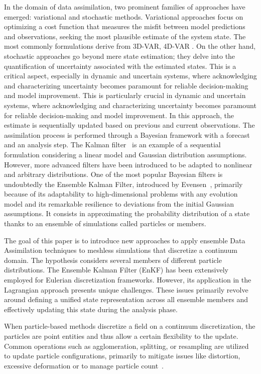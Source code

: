 In the domain of data assimilation, two prominent families of approaches have emerged: variational and stochastic methods. Variational approaches \cite{variational_method} focus on optimizing a cost function that measures the misfit between model predictions and observations, seeking the most plausible estimate of the system state. The most commonly formulations derive from 3D-VAR, 4D-VAR \cite{talagrand1997assimilation}. On the other hand, stochastic approaches go beyond mere state estimation; they delve into the quantification of uncertainty associated with the estimated states. This is a critical aspect, especially in dynamic and uncertain systems, where acknowledging and characterizing uncertainty becomes paramount for reliable decision-making and model improvement. This is particularly crucial in dynamic and uncertain systems, where acknowledging and characterizing uncertainty becomes paramount for reliable decision-making and model improvement. In this approach, the estimate is sequentially updated based on previous and current observations. The assimilation process is performed through a Bayesian framework with a forecast and an analysis step. The Kalman filter~\cite{kalman_new_1960} is an example of a sequential formulation considering a linear model and Gaussian distribution assumptions. However, more advanced filters have been introduced to be adapted to nonlinear and arbitrary distributions. One of the most popular Bayesian filters is undoubtedly the Ensemble Kalman Filter, introduced by Evensen~\cite{evensen_sequential_1994}, primarily because of its adaptability to high-dimensional problems with any evolution model and its remarkable resilience to deviations from the initial Gaussian assumptions. It consists in approximating the probability distribution of a state thanks to an ensemble of simulations called particles or members. \newline

The goal of this paper is to introduce new approaches to apply ensemble Data Assimilation techniques to meshless simulations that discretize a continuum domain. The hypothesis considers several members of different particle distributions. The Ensemble Kalman Filter (EnKF) has been extensively employed for Eulerian discretization frameworks. However, its application in the Lagrangian approach presents unique challenges. These issues primarily revolve around defining a unified state representation across all ensemble members and effectively updating this state during the analysis phase.

When particle-based methods discretize a field on a continuum discretization, the particles are point entities and thus allow a certain flexibility to the update. Common operations such as agglomeration, splitting, or resampling are utilized to update particle configurations, primarily to mitigate issues like distortion, excessive deformation or to manage particle count~\cite{yue_continuum_2015,cottet_multi-purpose_1999}.

